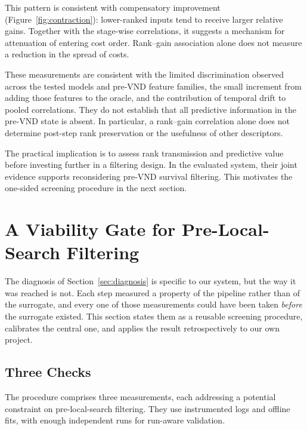 \documentclass[a4paper,fleqn]{cas-dc}
\begin{document}
This pattern is consistent with compensatory improvement
(Figure~\ref{fig:contraction}): lower-ranked inputs tend to receive larger
relative gains. Together with the stage-wise correlations, it suggests a
mechanism for attenuation of entering cost order. Rank--gain association alone
does not measure a reduction in the spread of costs.

These measurements are consistent with the limited discrimination observed
across the tested models and pre-VND feature families, the small increment from
adding those features to the oracle, and the contribution of temporal drift to
pooled correlations. They do not establish that all predictive information in
the pre-VND state is absent. In particular, a rank--gain correlation alone does
not determine post-step rank preservation or the usefulness of other descriptors.

The practical implication is to assess rank transmission and predictive value
before investing further in a filtering design. In the evaluated system, their
joint evidence supports reconsidering pre-VND survival filtering. This motivates
the one-sided screening procedure in the next section.


\section{A Viability Gate for Pre-Local-Search Filtering}\label{sec:gate}

The diagnosis of Section~\ref{sec:diagnosis} is specific to our system, but the
way it was reached is not. Each step measured a property of the pipeline rather
than of the surrogate, and every one of those measurements could have been taken
\emph{before} the surrogate existed. This section states them as a reusable
screening procedure, calibrates the central one, and applies the result
retrospectively to our own project.

\subsection{Three Checks}\label{sec:gate-checks}

The procedure comprises three measurements, each addressing a potential
constraint on pre-local-search filtering. They use instrumented logs and offline
fits, with enough independent runs for run-aware validation.
\end{document}
